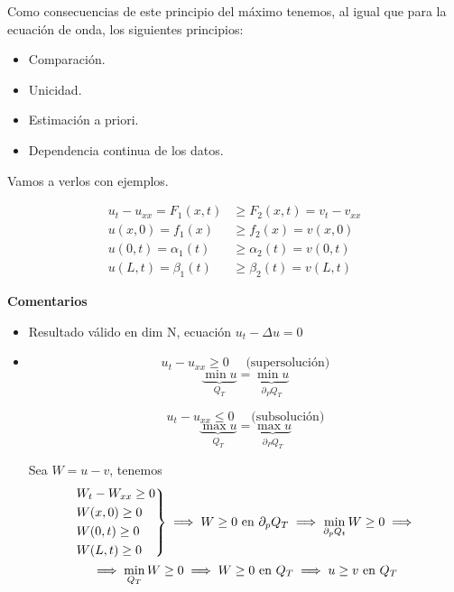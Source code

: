 	 Como consecuencias de este principio del máximo tenemos, al igual que para la ecuación de onda, los siguientes principios:
	 \begin{itemize}[itemsep = 0pt]
		\item Comparación.
		\item Unicidad.
		\item Estimación a priori.
		\item Dependencia continua de los datos.

	 \end{itemize}

	 Vamos a verlos con ejemplos.

	 \begin{example}[Comparación]
		\begin{align*}
			u_t - u_{xx} = F_1(x,t) &\geq F_2(x,t) = v_t - v_{xx} \\
			u(x,0) = f_1(x) &\geq f_2(x) = v(x,0) \\
			u(0,t) = \alpha_1(t) &\geq \alpha_2(t) = v(0,t)\\
			u(L,t) = \beta_1(t) &\geq \beta_2(t) = v(L,t)
		\end{align*}

		\textbf{Comentarios}
		\begin{itemize}
			\item Resultado válido en dim N, ecuación $u_t - \Delta u = 0$
			\item \[u_t - u_{xx} \geq 0 \quad\text{ (supersolución)}\]
				\[ \underbrace{\min u}_{Q_T} = \underbrace{\min u}_{\partial_P Q_T} \]

				\[u_t - u_{xx} \leq 0 \quad\text{ (subsolución)}\]
				\[ \underbrace{\max u}_{Q_T} = \underbrace{\max u}_{\partial_P Q_T} \]

				Sea $W = u-v$, tenemos
				\begin{gather*}
				\begin{rcases}
					W_t - W_{xx} \geq 0\\
					W(x,0) \geq 0 \\
					W(0,t) \geq 0 \\
					W(L,t) \geq 0
				\end{rcases}
				\implies W \geq 0 \text{ en } \partial_p Q_T \implies \min\limits_{\partial_p Q_t} W \geq 0 \implies\\
				\implies \min\limits_{Q_T} W \geq 0 \implies W \geq 0 \text{ en } Q_T \implies u \geq v \text{ en } Q_T
				\end{gather*}
		\end{itemize}

	 \end{example}

